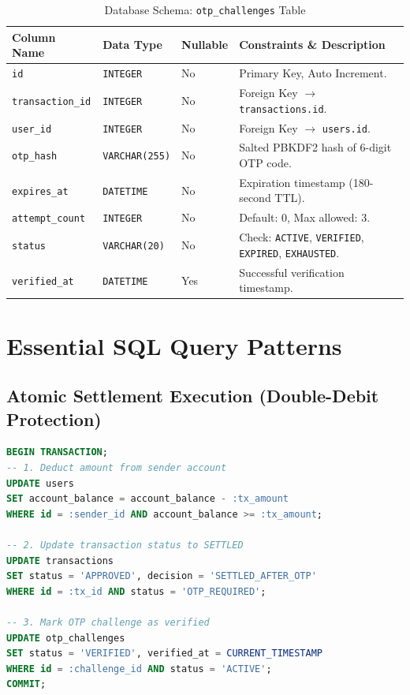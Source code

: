 \begin{table}[h]
\centering
\caption{Database Schema: \texttt{otp\_challenges} Table}
\label{tab:otp_challenges_schema}
\begin{tabularx}{\textwidth}{lp{2.8cm}p{1.8cm}X}
\toprule
\textbf{Column Name} & \textbf{Data Type} & \textbf{Nullable} & \textbf{Constraints \& Description} \\
\midrule
\texttt{id} & \texttt{INTEGER} & No & Primary Key, Auto Increment. \\
\texttt{transaction\_id} & \texttt{INTEGER} & No & Foreign Key $\to$ \texttt{transactions.id}. \\
\texttt{user\_id} & \texttt{INTEGER} & No & Foreign Key $\to$ \texttt{users.id}. \\
\texttt{otp\_hash} & \texttt{VARCHAR(255)} & No & Salted PBKDF2 hash of 6-digit OTP code. \\
\texttt{expires\_at} & \texttt{DATETIME} & No & Expiration timestamp (180-second TTL). \\
\texttt{attempt\_count} & \texttt{INTEGER} & No & Default: 0, Max allowed: 3. \\
\texttt{status} & \texttt{VARCHAR(20)} & No & Check: \texttt{ACTIVE}, \texttt{VERIFIED}, \texttt{EXPIRED}, \texttt{EXHAUSTED}. \\
\texttt{verified\_at} & \texttt{DATETIME} & Yes & Successful verification timestamp. \\
\bottomrule
\end{tabularx}
\end{table}

\section{Essential SQL Query Patterns}
\subsection{Atomic Settlement Execution (Double-Debit Protection)}
\begin{lstlisting}[language=SQL, caption={Atomic Settlement and Balance Deduction Query}]
BEGIN TRANSACTION;
-- 1. Deduct amount from sender account
UPDATE users 
SET account_balance = account_balance - :tx_amount 
WHERE id = :sender_id AND account_balance >= :tx_amount;

-- 2. Update transaction status to SETTLED
UPDATE transactions 
SET status = 'APPROVED', decision = 'SETTLED_AFTER_OTP' 
WHERE id = :tx_id AND status = 'OTP_REQUIRED';

-- 3. Mark OTP challenge as verified
UPDATE otp_challenges 
SET status = 'VERIFIED', verified_at = CURRENT_TIMESTAMP 
WHERE id = :challenge_id AND status = 'ACTIVE';
COMMIT;
\end{lstlisting}

